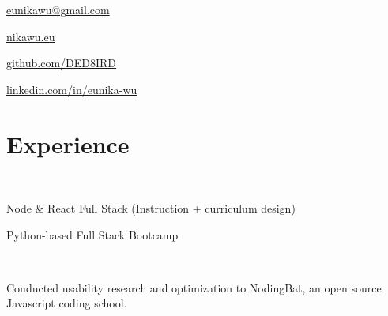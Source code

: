 \documentclass[]{hieudo-build}
\begin{document}
{
	\ci{\faEnvelope} \href{mailto:eunikawu@gmail.com}{ eunikawu@gmail.com } \par
    \ci{\faGlobe} \href{http://nikawu.eu}{ nikawu.eu } \par
	\ci{\faGithub} \href{https://github.com/DED8IRD}{ github.com/DED8IRD } \par
	\ci{\faLinkedinSquare} \href{https://www.linkedin.com/in/eunika-wu/}{ linkedin.com/in/eunika-wu }
}

%
%
\begin{minipage}[t]{0.63\textwidth} 

\section{Experience}

 \\
\vspace{\topsep} %
\begin{tightemize}
\item Node \& React Full Stack (Instruction + curriculum design) \\
\smallskip
{}
\item Python-based Full Stack Bootcamp \\
\smallskip
{}
\end{tightemize}
\sectionsep

 \\
\begin{tightemize}
\item Conducted usability research and optimization to NodingBat, an open source Javascript coding school. \\
\smallskip
{}
\end{tightemize}
\sectionsep


\end{minipage}
\end{document}
